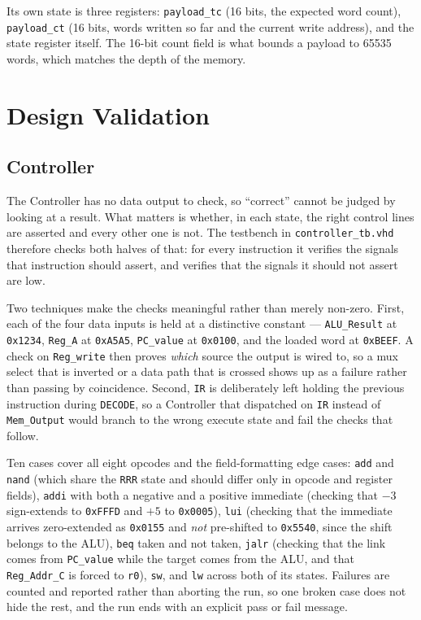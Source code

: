 \documentclass[11pt,letterpaper]{article}
\begin{document}
Its own state is three registers: \texttt{payload\_tc} (16 bits, the expected
word count), \texttt{payload\_ct} (16 bits, words written so far and the
current write address), and the state register itself. The 16-bit count field
is what bounds a payload to 65535 words, which matches the depth of the memory.

\section{Design Validation}

\subsection{Controller}
The Controller has no data output to check, so ``correct'' cannot be judged by
looking at a result. What matters is whether, in each state, the right control
lines are asserted and every other one is not. The testbench in
\texttt{controller\_tb.vhd} therefore checks both halves of that: for every
instruction it verifies the signals that instruction should assert, and
verifies that the signals it should not assert are low.

Two techniques make the checks meaningful rather than merely non-zero. First,
each of the four data inputs is held at a distinctive constant ---
\texttt{ALU\_Result} at \texttt{0x1234}, \texttt{Reg\_A} at \texttt{0xA5A5},
\texttt{PC\_value} at \texttt{0x0100}, and the loaded word at \texttt{0xBEEF}.
A check on \texttt{Reg\_write} then proves \emph{which} source the output is
wired to, so a mux select that is inverted or a data path that is crossed shows
up as a failure rather than passing by coincidence. Second, \texttt{IR} is
deliberately left holding the previous instruction during \texttt{DECODE}, so a
Controller that dispatched on \texttt{IR} instead of \texttt{Mem\_Output} would
branch to the wrong execute state and fail the checks that follow.

Ten cases cover all eight opcodes and the field-formatting edge cases:
\texttt{add} and \texttt{nand} (which share the \texttt{RRR} state and should
differ only in opcode and register fields), \texttt{addi} with both a negative
and a positive immediate (checking that $-3$ sign-extends to \texttt{0xFFFD}
and $+5$ to \texttt{0x0005}), \texttt{lui} (checking that the immediate arrives
zero-extended as \texttt{0x0155} and \emph{not} pre-shifted to \texttt{0x5540},
since the shift belongs to the ALU), \texttt{beq} taken and not taken,
\texttt{jalr} (checking that the link comes from \texttt{PC\_value} while the
target comes from the ALU, and that \texttt{Reg\_Addr\_C} is forced to
\texttt{r0}), \texttt{sw}, and \texttt{lw} across both of its states. Failures
are counted and reported rather than aborting the run, so one broken case does
not hide the rest, and the run ends with an explicit pass or fail message.
\end{document}
